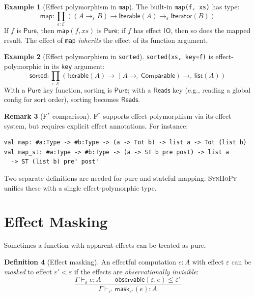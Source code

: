 \documentclass[11pt,a4paper]{report}
\theoremstyle{definition}
\newtheorem{definition}{Definition}[chapter]
\newtheorem{example}[definition]{Example}
\newtheorem{remark}[definition]{Remark}
\theoremstyle{plain}
\newcommand{\Pure}{\mathsf{Pure}}
\newcommand{\Reads}{\mathsf{Reads}}
\newcommand{\IO}{\mathsf{IO}}
\newcommand{\fstar}{F$^{*}$}
\newcommand{\synhopy}{\textsc{SynHoPy}}
\begin{document}
\begin{example}[Effect polymorphism in \texttt{map}]
The built-in \lstinline[style=python]{map(f, xs)} has type:
\[
  \mathsf{map} : \prod_{\varepsilon : \mathcal{E}}
    \left((A \to_\varepsilon B) \to \mathsf{Iterable}(A) \to_\varepsilon \mathsf{Iterator}(B)\right)
\]
If $f$ is $\Pure$, then $\mathsf{map}(f, xs)$ is $\Pure$; if $f$ has effect
$\IO$, then so does the mapped result.  The effect of \lstinline[style=python]{map}
\emph{inherits} the effect of its function argument.
\end{example}

\begin{example}[Effect polymorphism in \texttt{sorted}]
\lstinline[style=python]{sorted(xs, key=f)} is effect-polymorphic in its
\lstinline[style=python]{key} argument:
\[
  \mathsf{sorted} : \prod_{\varepsilon : \mathcal{E}}
    (\mathsf{Iterable}(A) \to (A \to_\varepsilon \mathsf{Comparable}) \to_\varepsilon
      \mathsf{list}(A))
\]
With a $\Pure$ key function, sorting is $\Pure$; with a $\Reads$ key (e.g.,
reading a global config for sort order), sorting becomes $\Reads$.
\end{example}

\begin{remark}[\fstar{} comparison]
\fstar{} supports effect polymorphism via its effect system, but requires
explicit effect annotations.  For instance:
\begin{lstlisting}[style=fstar]
val map: #a:Type -> #b:Type -> (a -> Tot b) -> list a -> Tot (list b)
val map_st: #a:Type -> #b:Type -> (a -> ST b pre post) -> list a
  -> ST (list b) pre' post'
\end{lstlisting}
Two separate definitions are needed for pure and stateful mapping.  \synhopy{}
unifies these with a single effect-polymorphic type.
\end{remark}


\section{Effect Masking}

Sometimes a function with apparent effects can be treated as pure.

\begin{definition}[Effect masking]
An effectful computation $e : A$ with effect $\varepsilon$ can be
\emph{masked} to effect $\varepsilon' < \varepsilon$ if the effects are
\emph{observationally invisible}:
\[
  \frac{
    \Gamma \vdash_\varepsilon e : A \qquad
    \mathsf{observable}(\varepsilon, e) \leq \varepsilon'
  }{
    \Gamma \vdash_{\varepsilon'} \mathsf{mask}_{\varepsilon'}(e) : A
  }
\]
\end{definition}
\end{document}
